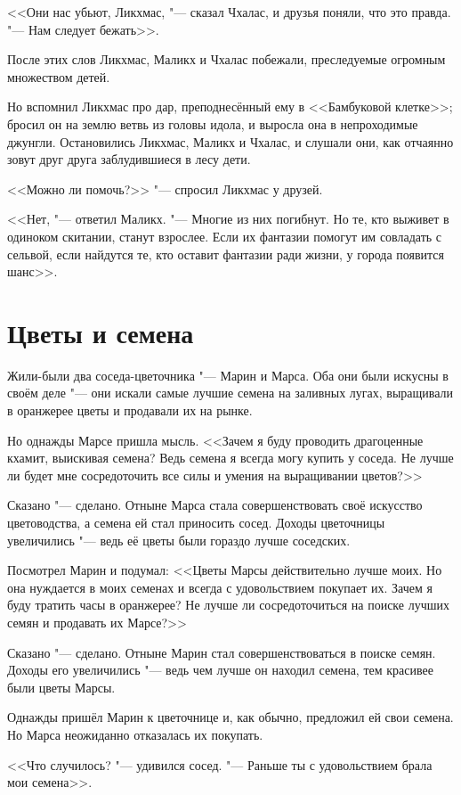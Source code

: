 <<Они нас убьют, Ликхмас, "--- сказал Чхалас, и друзья поняли, что это правда.
"--- Нам следует бежать>>.

После этих слов Ликхмас, Маликх и Чхалас побежали, преследуемые огромным множеством детей.

Но вспомнил Ликхмас про дар, преподнесённый ему в <<Бамбуковой клетке>>;
бросил он на землю ветвь из головы идола, и выросла она в непроходимые джунгли.
Остановились Ликхмас, Маликх и Чхалас, и слушали они, как отчаянно зовут друг друга заблудившиеся в лесу дети.

<<Можно ли помочь?>> "--- спросил Ликхмас у друзей.

<<Нет, "--- ответил Маликх.
"--- Многие из них погибнут.
Но те, кто выживет в одиноком скитании, станут взрослее.
Если их фантазии помогут им совладать с сельвой, если найдутся те, кто оставит фантазии ради жизни, у города появится шанс>>.

\section{Цветы и семена}

Жили-были два соседа-цветочника "--- Марин и Марса.
Оба они были искусны в своём деле "--- они искали самые лучшие семена на заливных лугах, выращивали в оранжерее цветы и продавали их на рынке.

Но однажды Марсе пришла мысль.
<<Зачем я буду проводить драгоценные кхамит, выискивая семена?
Ведь семена я всегда могу купить у соседа.
Не лучше ли будет мне сосредоточить все силы и умения на выращивании цветов?>>

Сказано "--- сделано.
Отныне Марса стала совершенствовать своё искусство цветоводства, а семена ей стал приносить сосед.
Доходы цветочницы увеличились "--- ведь её цветы были гораздо лучше соседских.

Посмотрел Марин и подумал: <<Цветы Марсы действительно лучше моих.
Но она нуждается в моих семенах и всегда с удовольствием покупает их.
Зачем я буду тратить часы в оранжерее?
Не лучше ли сосредоточиться на поиске лучших семян и продавать их Марсе?>>

Сказано "--- сделано.
Отныне Марин стал совершенствоваться в поиске семян.
Доходы его увеличились "--- ведь чем лучше он находил семена, тем красивее были цветы Марсы.

Однажды пришёл Марин к цветочнице и, как обычно, предложил ей свои семена.
Но Марса неожиданно отказалась их покупать.

<<Что случилось? "--- удивился сосед.
"--- Раньше ты с удовольствием брала мои семена>>.

